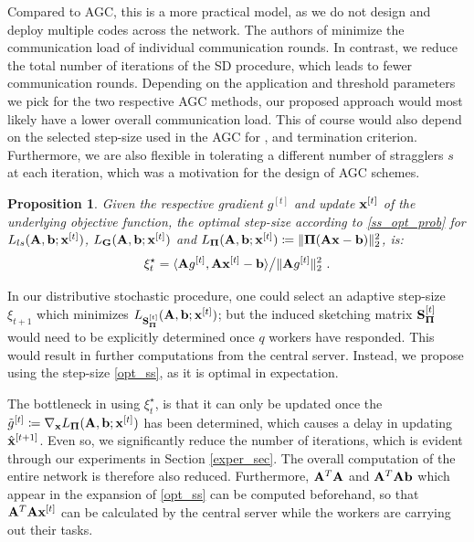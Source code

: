 \documentclass[journal,letterpaper,onecolumn,twoside,nofonttune]{IEEEtran}
\newcommand{\xb}{\bold{x}}
\newcommand{\xbh}{{\hat{\bold{x}}}}
\newcommand{\Gb}{\bold{G}}
\newcommand{\Pibold}{\bold{\Pi}}
\newcommand{\gt}{\tilde{g}}
\newcommand{\Sb}{\bold{S}}
\newcommand{\SbPi}{\Sb_{\Pibold}}
\newcommand{\Ab}{\bold{A}}
\newcommand{\bb}{\bold{b}}
\newtheorem{Prop}{Proposition}
\begin{document}
Compared to AGC, this is a more practical model, as we do not design and deploy multiple codes across the network. The authors of \cite{CT22} minimize the communication load of individual communication rounds. In contrast, we reduce the total number of iterations of the SD procedure, which leads to fewer communication rounds. Depending on the application and threshold parameters we pick for the two respective AGC methods, our proposed approach would most likely have a lower overall communication load. This of course would also depend on the selected step-size used in the AGC for \cite{CT22}, and termination criterion. Furthermore, we are also flexible in tolerating a different number of stragglers $s$ at each iteration, which was a motivation for the design of AGC schemes.

\begin{Prop}
\label{prop_opt_ss}
  Given the respective gradient $g^{[t]}$ and update $\xb^{[t]}$ of the underlying objective function, the optimal step-size according to \eqref{ss_opt_prob} for $L_{ls}(\Ab,\bb;\xb^{[t]})$, $L_{\Gb}(\Ab,\bb;\xb^{[t]})$ and $L_{\Pibold}(\Ab,\bb;\xb^{[t]}) \coloneqq \|\Pibold(\Ab\xb-\bb)\|_2^2$, is:
  \begin{equation}
  \label{opt_ss}
    \xi_t^{\star} = \langle\Ab g^{[t]},\Ab\xb^{[t]}-\bb\rangle\big/\|\Ab g^{[t]}\|_2^2\ .
  \end{equation}
\end{Prop}

In our distributive stochastic procedure, one could select an adaptive step-size $\xi_{t+1}$ which minimizes $L_{\SbPi^{[t]}}(\Ab,\bb;\xb^{[t]})$; but the induced sketching matrix $\SbPi^{[t]}$ would need to be explicitly determined once $q$ workers have responded. This would result in further computations from the central server. Instead, we propose using the step-size \eqref{opt_ss}, as it is optimal in expectation.

The bottleneck in using $\xi_t^{\star}$, is that it can only be updated once the $\gt^{[t]}\coloneqq\nabla_{\xb}L_{\Pibold}(\Ab,\bb;\xb^{[t]})$ has been determined, which causes a delay in updating $\xbh^{[t+1]}$. Even so, we significantly reduce the number of iterations, which is evident through our experiments in Section \ref{exper_sec}. The overall computation of the entire network is therefore also reduced. Furthermore, $\Ab^T\Ab$ and $\Ab^T\Ab\bb$ which appear in the expansion of \eqref{opt_ss} can be computed beforehand, so that $\Ab^T\Ab\xb^{[t]}$ can be calculated by the central server while the workers are carrying out their tasks.%
\end{document}

